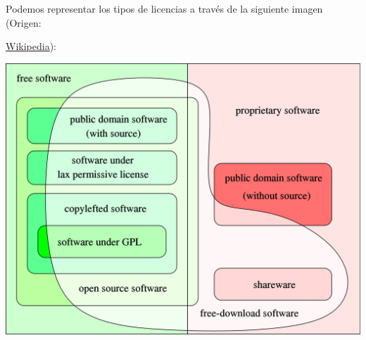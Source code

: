 Podemos representar los tipos de licencias a través de la siguiente imagen (Origen: {\href{https://en.wikipedia.org/wiki/Free_software\#Definition_and_the_Four_Essential_Freedoms_of_Free_Software}{Wikipedia}):

\begin{center}
    \vspace{-10pt}
    \includegraphics[width=0.65\linewidth]{free_and_nonfree_software.png}
\end{center}

\let\section\subsection
\let\subsection\subsubsection
\graphicspath{{../../../temas_comunes/gnu_linux/img}}


\let\subsection\section
\let\subsubsection\subsection
\graphicspath{{img/si}}

}
